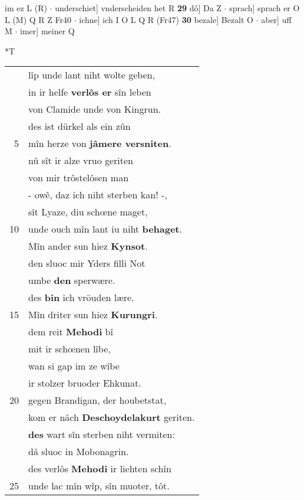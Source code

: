 \documentclass[8pt,a4paper,notitlepage]{article}
\begin{document}
\begin{table}[ht]
\begin{minipage}[t]{0.5\linewidth}
im ez L (R)  $\cdot$ underschiet] vnderscheiden het R \textbf{29} dô] Da Z  $\cdot$ sprach] sprach er O L (M) Q R Z Fr40  $\cdot$ ichne] ich I O L Q R (Fr47) \textbf{30} bezale] Bezalt O  $\cdot$ aber] uff M  $\cdot$ imer] meiner Q \newline
\end{minipage}
\hspace{0.5cm}
\begin{minipage}[t]{0.5\linewidth}
\small
\begin{center}*T
\end{center}
\begin{tabular}{rl}
 & lîp unde lant niht wolte geben,\\ 
 & in ir helfe \textbf{verlôs er} sîn leben\\ 
 & von Clamide unde von Kingrun.\\ 
 & des ist dürkel als ein zûn\\ 
5 & mîn herze von \textbf{jâmere versniten}.\\ 
 & nû sît ir alze vruo geriten\\ 
 & von mir trôstelôsen man\\ 
 & - owê, daz ich niht sterben kan! -,\\ 
 & sît Lyaze, diu schœne maget,\\ 
10 & unde ouch mîn lant iu niht \textbf{behaget}.\\ 
 & Mîn ander sun hiez \textbf{Kynsot}.\\ 
 & den sluoc mir Yders filli Not\\ 
 & umbe \textbf{den} sperwære.\\ 
 & des \textbf{bin} ich vröuden lære.\\ 
15 & Mîn driter sun hiez \textbf{Kurungri}.\\ 
 & dem reit \textbf{Mehodi} bî\\ 
 & mit ir schœnen lîbe,\\ 
 & wan si gap im ze wîbe\\ 
 & ir stolzer bruoder Ehkunat.\\ 
20 & gegen Brandigan, der houbetstat,\\ 
 & kom er nâch \textbf{Deschoydelakurt} geriten.\\ 
 & \textbf{des} wart sîn sterben niht vermiten:\\ 
 & dâ sluoc in Mobonagrin.\\ 
 & des verlôs \textbf{Mehodi} ir liehten schîn\\ 
25 & unde lac mîn wîp, sîn muoter, tôt.\\ 

\end{tabular}
\end{minipage}
\end{table}
\end{document}
